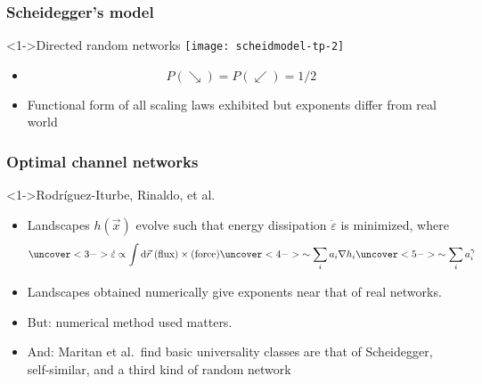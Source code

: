 \begin{frame}[label=]
  \frametitle{Scheidegger's model}

  \begin{block}<1->{Directed random networks\cite{scheidegger1967a,scheidegger1991a}}
    \texttt{[image: scheidmodel-tp-2]}
    \begin{itemize}
    \item<1->
      $$P(\searrow) = P (\swarrow) = 1/2$$
    \item<1->
      Functional form of all scaling laws exhibited
      but exponents differ from real world\cite{takayasu1988a,takayasu1989a,takayasu1989b}
    \end{itemize}
  \end{block}

\end{frame}


\begin{frame}[label=]
  \frametitle{Optimal channel networks}

  \begin{block}<1->{Rodr\'iguez-Iturbe, Rinaldo, et al.\cite{rodriguez-iturbe1997a}}
    \begin{itemize}
    \item<2-> 
      Landscapes $h(\vec{x})$ evolve such that
      energy dissipation $\dot{\varepsilon}$ is minimized, where 
      $$
      \uncover<3->{
      \dot{\varepsilon} 
        \propto \int \mbox{d}\vec{r} \; (\mbox{flux}) \times (\mbox{force}) 
      }
      \uncover<4->{
        \sim  \sum_i a_i \nabla h_i 
      }
      \uncover<5->{
        \sim  \sum_i a_i^\gamma 
      }
      $$
    \item<6->
      Landscapes obtained numerically give exponents near that of real networks.
    \item<7->
      \alert{But:}
      numerical method used matters.
    \item<8->
      \alert{And:}
      Maritan et al.\ find basic universality
      classes are that of Scheidegger, self-similar,
      and a third kind of random network\cite{maritan1996b}
    \end{itemize}
  \end{block}
  
\end{frame}

